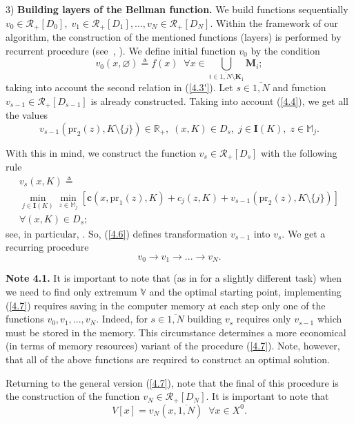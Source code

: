 \documentclass[numbers,sort&compress]{IntechOpen-Book}%
\begin{document}
3) {\bf Building layers of the Bellman function.}
We build functions sequentially
$v_0 \in \mathcal{R}_+[D_0],\;v_1 \in \mathcal{R}_+[D_1],...,v_N \in \mathcal{R}_+[D_N]$.
Within the framework of our algorithm, the construction of the mentioned functions
(layers)
is performed by  recurrent procedure
(see~\cite[$\S$4.9]{14}, \cite{18}).
We define
initial
function $ v_0 $ by the condition
\begin{equation}\label{4.5}
  v_0(x,\varnothing) {\triangleq} f(x)\;\;
  \forall{x} \in \bigcup\limits_{i \in \overline{1,N} \setminus \mathbf{K}_1} \mathbf{\mathbf{M}}_i;
\end{equation}
taking into account the second relation in  (\ref{4.3'}).
Let $s \in \overline{1,N}$
and function
$v_{s-1} \in \mathcal{R}_+[D_{s-1}]$
is already constructed.
Taking into account
 (\ref{4.4}),
we get all the values
$$
  v_{s-1}(\mathrm{pr}_2(z),K \setminus \{j\}) \in \mathbb{R}_+,\;
  (x,K) \in D_s,\;j \in \mathbf{I}(K),\;z \in \mathbb{M}_j.
$$

With this in mind,
we construct the function
$v_s \in \mathcal{R}_+[D_s]$
with the following rule
\begin{multline}
  \label{4.6}
  v_s(x,K) {\triangleq} \\
  \min\limits_{j \in \mathbf{I}(K)} \min\limits_{z \in \mathbb{M}_j}
  [\mathbf{c}(x,\mathrm{pr}_1(z),K) + c_j(z,K) + v_{s-1}(\mathrm{pr}_2(z),K \setminus \{j\})] \\
  \forall{(x,K)} \in D_s;
\end{multline}
see, in particular,
\cite[(4.3.13)]{4}.
So,  (\ref{4.6})
defines transformation
$v_{s-1}$ into $v_s.$
We get a recurring procedure
\begin{equation}\label{4.7}
  v_0 \longrightarrow v_1 \longrightarrow ... \longrightarrow v_N.
\end{equation}

{\bf Note 4.1.}
It is important to note that
(as in \cite {22} for a slightly different task)
when we need to find
only extremum
$ \mathbb V $
and the optimal starting point,
implementing  (\ref{4.7})
requires saving in the computer memory
at each step
only one of the functions
$v_0,v_1,...,v_N$.
Indeed,
for
$s \in \overline{1,N}$
building $v_s$
requires only $v_{s-1}$
which must be stored in the memory.
This circumstance determines a more economical
(in terms of memory resources)
variant of the procedure  (\ref{4.7}).
Note, however,
that all of the above functions are required to construct an optimal solution.

Returning to the general version  (\ref{4.7}),
note that the final of this procedure is the construction of the function
$v_N \in \mathcal{R}_+[D_N]$.
It is important to note that
\begin{equation}\label{4.8}
  V[x] = v_N(x,\overline{1,N})\;\;\forall{x} \in X^0.
\end{equation}
\end{document}
